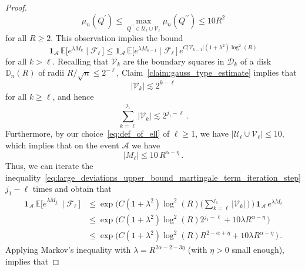 \documentclass[11pt]{amsart}
\theoremstyle{definition}
\theoremstyle{remark}
\numberwithin{equation}{section}
\def\la{{\lambda}}
\newcommand{\bD}{\mathbb D}
\newcommand{\bE}{\mathbb E}
\begin{document}
\begin{proof}
		\begin{equation}
			\label{eq:bound_on_point_count_on_the_good_event}
			\mu_n(Q^\prime) \le \max_{Q^{\prime\prime}\in \mathcal{U}_\ell \cup \mathcal{V}_\ell} \mu_n(Q^{\prime\prime}) \le 10R^2
		\end{equation}		
		for all $R\ge 2$. This observation implies the bound  
		\begin{equation}
			\label{eq:large_deviations_upper_bound_martingale_term_iteration_step}
			\mathbf{1}_{\mathcal{A}} \, \bE\big[e^{\la M_{k}} \mid \mathcal{F}_{\ell} \, \big] \le \mathbf{1}_{\mathcal{A}} \, \bE\big[e^{\la M_{k-1}} \mid \mathcal{F}_{\ell} \, \big]  \, e^{C|\mathcal{V}_{k-1}| (1+\la^2) \log^2(R)} 
		\end{equation}
		for all $k>\ell$. Recalling that $\mathcal{V}_k$ are the boundary squares in $\mathcal{D}_k$ of a disk $\bD_n(R)$ of radii $R/\sqrt{n} \le 2^{-\ell}$, Claim~\ref{claim:gauss_type_estimate} implies that
		\[
		|\mathcal{V}_{k}| \lesssim 2^{k-\ell}
		\]
		for all $k\ge \ell$, and hence
		\begin{equation}
			\label{eq:bound_on_sum_V_k}
			\sum_{k=\ell}^{j_1} |\mathcal{V}_k| \lesssim 2^{j_1 - \ell} \, .
		\end{equation}
		Furthermore, by our choice~\eqref{eq:def_of_ell} of $\ell\ge1$, we have $|\mathcal{U}_\ell \cup \mathcal{V}_\ell| \le 10$, which implies that on the event $\mathcal{A}$ we have
		\begin{equation}
			\label{eq:bound_on_M_l_assuming_good_event}
			|M_\ell| \le 10 \, R^{\alpha - \eta}\, .
		\end{equation}
		Thus, we can iterate the inequality~\eqref{eq:large_deviations_upper_bound_martingale_term_iteration_step} $j_1 - \ell$ times and obtain that 
		\begin{align}
			\label{eq:large_deviations_upper_bound_martingale_term_final_bound_on_MGF} \nonumber
			\mathbf{1}_{\mathcal{A}} \, \bE\big[e^{\la M_{j_1}} \mid \mathcal{F}_{\ell} \, \big] & \le   \exp\Big(C(1+\la^2) \log^2(R) \big(\sum_{k=\ell}^{j_1} |\mathcal{V}_k| \, \big) \, \Big) \, \mathbf{1}_{\mathcal{A}} \,e^{\la M_{\ell}}  \\\nonumber & \le \exp\Big(C(1+\la^2) \log^2(R) 2^{j_1 - \ell}  + 10\la R^{\alpha -\eta} \,\Big)  \\ &\le \exp\Big(C(1+\la^2) \log^2(R) R^{2-\alpha + \eta} + 10\la R^{\alpha -\eta} \, \Big) \, .
		\end{align}
		Applying Markov's inequality with $\la = R^{2\alpha -2 - 3\eta}$ (with $\eta>0$ small enough), implies that

\end{proof}
\end{document}
